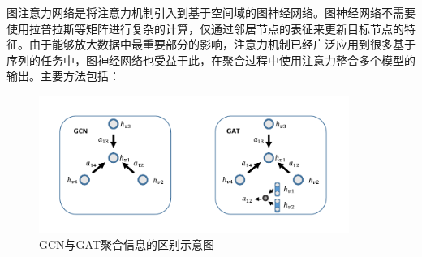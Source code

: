 图注意力网络是将注意力机制引入到基于空间域的图神经网络。图神经网络不需要使用拉普拉斯等矩阵进行复杂的计算，仅通过邻居节点的表征来更新目标节点的特征。由于能够放大数据中最重要部分的影响，注意力机制已经广泛应用到很多基于序列的任务中，图神经网络也受益于此，在聚合过程中使用注意力整合多个模型的输出。主要方法包括：
\begin{figure}[htb]
    \includegraphics[width=0.9\textwidth]{fig/gcn-gat.pdf}
    \caption{GCN与GAT聚合信息的区别示意图}
    \label{fig:GCN-GAT}
  \end{figure}
